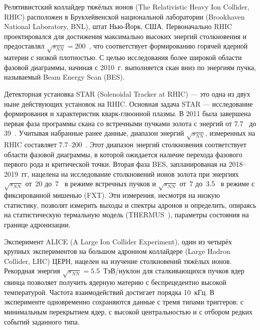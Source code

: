 \bigskip




Релятивистский коллайдер тяжёлых ионов (The Relativistic Heavy Ion Collider, RHIC) расположен в Брукхейвенской национальной лаборатории (Brookhaven National Laboratory, BNL), штат Нью-Йорк, США. Первоначально RHIC проектировался для достижения максимально высоких энергий столкновения и предоставлял $\sqrt{s_{NN}}=200$~\GeVperNucl, что соответствует формированию горячей ядерной материи с низкой плотностью. С целью исследования более широкой области фазовой диаграммы, начиная с 2010~г. выполняется скан вниз по энергиям пучка, называемый Beam Energy Scan (BES).

Детекторная установка STAR (Solenoidal Tracker at RHIC) --- это одна из двух ныне действующих установок на RHIC. Основная задача STAR --- исследование формирования и характеристик кварк-глюонной плазмы. В 2011 была завершена первая фаза программы скана со встречными пучками золота с энергий от 7.7~\GeVperNucl{} до 39~\GeVperNucl. Учитывая набранные ранее данные, диапазон энергий $\sqrt{s_{NN}}$, измеренных на RHIC составляет 7.7--200~\GeVperNucl. Этот диапазон энергий столкновения соответствует области фазовой диаграммы, в которой ожидается наличие перехода фазового первого рода и критической точки. Вторая фаза BES, запланированая на 2018--2019~гг, нацелена на исследование столкновений ионов золота при энергиях $\sqrt{s_{NN}}$ от~20 до~7~\GeVperNucl{} в режиме встречных пучков и $\sqrt{s_{NN}}$ от~7 до~3.5~\GeVperNucl{} в режиме с фиксированной мишенью (FXT). Эти измерения, несмотря на низкую статистику, позволят измерить выходы и спектры адронов и определить, опираясь на статистическую термальную модель (THERMUS~\cite{}), параметры состояния на границе адронизации.

\bigskip



Эксперимент ALICE (A Large Ion Collider Experiment), один из четырёх крупных экспериментов на большом адронном коллайдере (Large Hadron Collider, LHC) ЦЕРН, нацелен на изучение столкновений тяжёлых ионов. Рекордная энергия $\sqrt{s_{NN}}=5.5$~\mbox{ТэВ/нуклон} для сталкивающихся пучков ядер свинца позволяет получить ядерную материю с беспрецедентно высокой температурой. Частота взаимодействий достигает порядка 10~кГц. В эксперименте одновременно сохраняются данные с тремя типами триггеров: с минимальным перекрытием ядер, с высокой центральностью и с отбором редких событий заданного типа.

